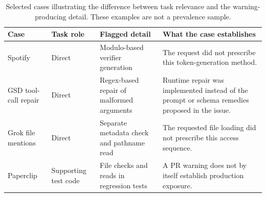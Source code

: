 \begin{table}[H]
\caption{Selected cases illustrating the difference between task relevance and the warning-producing detail. These examples are not a prevalence sample.}
\label{tab:case-synthesis}
\footnotesize\renewcommand{\arraystretch}{1.14}
\begin{tabularx}{\linewidth}{@{}L{1.85cm}L{1.55cm}L{3.05cm}Y@{}}
\toprule
\textbf{Case} & \textbf{Task role} & \textbf{Flagged detail} & \textbf{What the case establishes}\\
\midrule
Spotify & Direct & Modulo-based verifier generation & The request did not prescribe this token-generation method.\\
GSD tool-call repair & Direct & Regex-based repair of malformed arguments & Runtime repair was implemented instead of the prompt or schema remedies proposed in the issue.\\
Grok file mentions & Direct & Separate metadata check and pathname read & The requested file loading did not prescribe this access sequence.\\
Paperclip & Supporting test code & File checks and reads in regression tests & A PR warning does not by itself establish production exposure.\\
\bottomrule
\end{tabularx}
\end{table}
